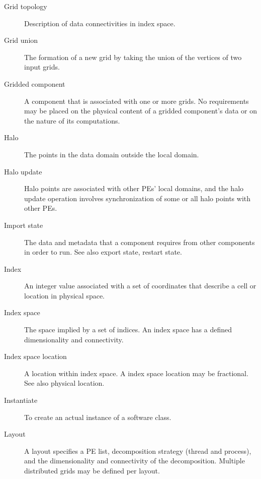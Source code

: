 \begin{description}
\item[Grid topology] \label{glos:GridTopo} Description of data 
  connectivities in index space.

\item[Grid union] \label{glos:GridUnion} The formation of a new grid
  by taking the union of the vertices of two input grids. 

\item[Gridded component] \label{glos:GridComp}
  A component that is associated with one or more grids.  No requirements 
  may be placed on the physical content of a gridded component's data or 
  on the nature of its computations. 

\item[Halo] \label{glos:Halo} 
  The points in the data domain outside the local domain. 

\item[Halo update] \label{glos:HaloUpdate}
  Halo points are associated with other PEs'
  local domains, and the halo update operation involves
  synchronization of some or all halo points with other PEs. 

\item[Import state] \label{glos:ImportState} The data and metadata 
  that a component requires from other components in order to run.  
  See also export state, restart state.

\item[Index] \label{glos:Index} An integer value associated with a set
  of coordinates that describe a cell or location in physical space.

\item[Index space] \label{glos:IndexSpace} The space implied 
  by a set of indices.  An index space has a defined dimensionality and 
  connectivity.

\item[Index space location] \label{glos:IndexSpaceloc} 
  A location within index space.  A index space location may be fractional.
  See also physical location.

\item[Instantiate] \label{glos:Instantiate}
  To create an actual instance of a software class.

\item[Layout] \label{glos:Layout} A layout specifies a PE list, 
  decomposition strategy (thread and process), and the dimensionality 
  and connectivity of the decomposition.  Multiple distributed 
  grids may be defined per layout.


\end{description}
